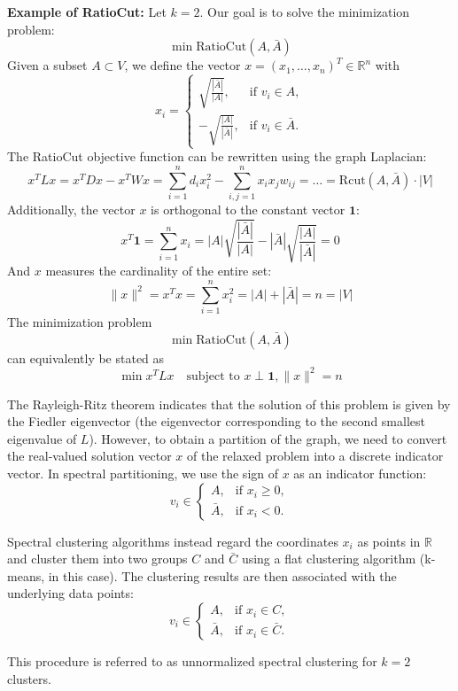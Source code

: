 \documentclass[unicode,11pt,a4paper,oneside,numbers=endperiod,openany]{scrartcl}
\begin{document}
\textbf{Example of RatioCut:}
Let \( k = 2 \). Our goal is to solve the minimization problem:
\[
\min \text{RatioCut}(A, \bar{A})
\]
Given a subset \( A \subset V \), we define the vector \( x = (x_1, \ldots, x_n)^T \in \mathbb{R}^n \) with
\[
x_i = \begin{cases}
    \sqrt{\frac{|\bar{A}|}{|A|}}, & \text{if } v_i \in A, \\
    -\sqrt{\frac{|A|}{|\bar{A}|}}, & \text{if } v_i \in \bar{A}.
\end{cases}
\]
The RatioCut objective function can be rewritten using the graph Laplacian:
\[
x^T L x = x^T D x - x^T W x = \sum_{i=1}^{n} d_i x^2_i - \sum_{i,j=1}^{n} x_i x_j w_{ij} = \ldots = \text{Rcut}(A,\bar{A}) \cdot |V|
\]
Additionally, the vector \( x \) is orthogonal to the constant vector \( \mathbf{1} \):
\[
x^T \mathbf{1} = \sum_{i=1}^{n} x_i = |A| \sqrt{\frac{|\bar{A}|}{|A|}} - |\bar{A}| \sqrt{\frac{|A|}{|\bar{A}|}} = 0
\]
And \( x \) measures the cardinality of the entire set:
\[
\|x\|^2 = x^T x = \sum_{i=1}^{n} x^2_i = |A| + |\bar{A}| = n = |V|
\]
The minimization problem
\[
\min \text{RatioCut}(A, \bar{A})
\]
can equivalently be stated as
\[
\min x^T L x \quad \text{subject to } x \perp \mathbf{1}, \|x\|^2 = n
\]

The Rayleigh-Ritz theorem indicates that the solution of this problem is given by the Fiedler eigenvector (the eigenvector corresponding to the second smallest eigenvalue of \( L \)). However, to obtain a partition of the graph, we need to convert the real-valued solution vector \( x \) of the relaxed problem into a discrete indicator vector. In spectral partitioning, we use the sign of \( x \) as an indicator function:
\[
v_i \in \begin{cases}
    A, & \text{if } x_i \geq 0, \\
    \bar{A}, & \text{if } x_i < 0.
\end{cases}
\]

Spectral clustering algorithms instead regard the coordinates \( x_i \) as points in \( \mathbb{R} \) and cluster them into two groups \( C \) and \( \bar{C} \) using a flat clustering algorithm (k-means, in this case). The clustering results are then associated with the underlying data points:
\[
v_i \in \begin{cases}
    A, & \text{if } x_i \in C, \\
    \bar{A}, & \text{if } x_i \in \bar{C}.
\end{cases}
\]

This procedure is referred to as unnormalized spectral clustering for \( k = 2 \) clusters.
\end{document}
